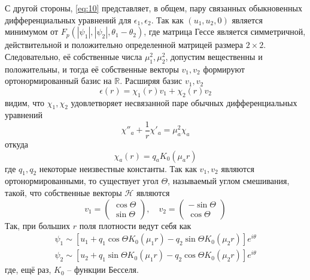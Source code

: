 С другой стороны, \eqref{eq:10} представляет, в общем, пару связанных 
обыкновенных дифференциальных уравнений для \( \epsilon_1, \epsilon_2 \). Так 
как \( (u_1, u_2, 0 ) \) является минимумом от 
\( F_p(|\psi_1|, |\psi_2|, \theta_1 - \theta_2) \), где матрица Гессе является  
симметричной, действительной и положительно определенной матрицей размера 
\( 2\times2 \). Следовательно, её собственные числа \( \mu_1^2, \mu_2^2\), 
допустим вещественны и положительны, и тогда её собственные векторы 
\( v_1, v_2 \) формируют ортонормированный базис на \( \mathbb{R} \). Расширяя 
базис \( v_1, v_2 \)
\begin{equation}
    \epsilon(r) = \chi_1(r) v_1 + \chi_2(r) v_2
    \label{eq:17}
\end{equation}
видим, что \( \chi_1, \chi_2 \) удовлетворяет несвязанной паре обычных 
дифференциальных уравнений
\begin{equation}
    \chi''_a + \frac{1}{r}\chi'_a = \mu_a^2 \chi_a
    \label{eq:18}
\end{equation}
откуда
\begin{equation}
    \chi_a(r) = q_a K_0(\mu_a r)
    \label{eq:19}
\end{equation}
где \( q_1, q_2 \) некоторые неизвестные константы. Так как \( v_1, v_2 \) 
являются ортонормированными, то существует угол \( \Theta \), называемый углом 
смешивания, такой, что собственные векторы \( \mathcal{H} \) являются
\begin{equation}
    v_1 = \left( \begin{array}{c}
        \cos\Theta \\
        \sin\Theta
    \end{array} \right), \quad
    v_2 = \left( \begin{array}{c}
        -\sin\Theta \\
        \cos\Theta
    \end{array} \right)
    \label{eq:20}
\end{equation}
Так, при больших \( r \) поля плотности ведут себя как 
\begin{gather}
    \psi_1 \sim \left[ u_1 + q_1\cos\Theta K_0(\mu_1 r) - 
        q_2\sin\Theta K_0(\mu_2 r) \right]e^{i\theta} \nonumber \\
    \psi_2 \sim \left[ u_2 + q_1\sin\Theta K_0(\mu_1 r) - 
        q_2\cos\Theta K_0(\mu_2 r) \right]e^{i\theta}
    \label{eq:21}
\end{gather}
где, ещё раз, \( K_0 \) -- функции Бесселя.

